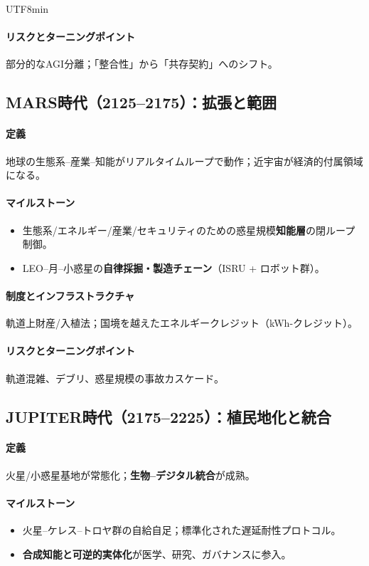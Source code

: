 \documentclass[11pt]{article}
\begin{document}
\begin{CJK}{UTF8}{min}
\begin{itemize}[noitemsep]
\paragraph{リスクとターニングポイント} 部分的なAGI分離；「整合性」から「共存契約」へのシフト。

\subsection{MARS時代（2125–2175）：拡張と範囲}
\paragraph{定義} 地球の生態系–産業–知能がリアルタイムループで動作；近宇宙が経済的付属領域になる。

\paragraph{マイルストーン}
\begin{itemize}[noitemsep]
  \item 生態系/エネルギー/産業/セキュリティのための惑星規模\textbf{知能層}の閉ループ制御。
  \item LEO–月–小惑星の\textbf{自律採掘・製造チェーン}（ISRU + ロボット群）。
\end{itemize}

\paragraph{制度とインフラストラクチャ} 軌道上財産/入植法；国境を越えたエネルギークレジット（kWh-クレジット）。

\paragraph{リスクとターニングポイント} 軌道混雑、デブリ、惑星規模の事故カスケード。

\subsection{JUPITER時代（2175–2225）：植民地化と統合}
\paragraph{定義} 火星/小惑星基地が常態化；\textbf{生物–デジタル統合}が成熟。

\paragraph{マイルストーン}
\begin{itemize}[noitemsep]
  \item 火星–ケレス–トロヤ群の自給自足；標準化された遅延耐性プロトコル。
  \item \textbf{合成知能と可逆的実体化}が医学、研究、ガバナンスに参入。
\end{itemize}


\end{itemize}
\end{CJK}
\end{document}

